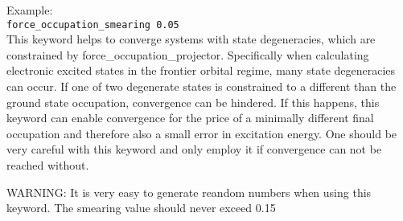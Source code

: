   Example: \\[1.0ex]
  \texttt{force\_occupation\_smearing  0.05} \\

This keyword helps to converge systems with state degeneracies, which are 
constrained by force\_occupation\_projector. Specifically 
when calculating electronic excited states in the frontier orbital regime, many state 
degeneracies can occur. If one of two degenerate states is constrained to a different 
than the ground state occupation, convergence can be hindered. If this happens, 
this keyword can enable convergence for the price of a minimally different final occupation 
and therefore also a small error in excitation energy. One should be very careful with 
this keyword and only employ it if convergence can not be reached without.

WARNING: It is very easy to generate reandom numbers when using this keyword. The 
smearing value should never exceed 0.15
